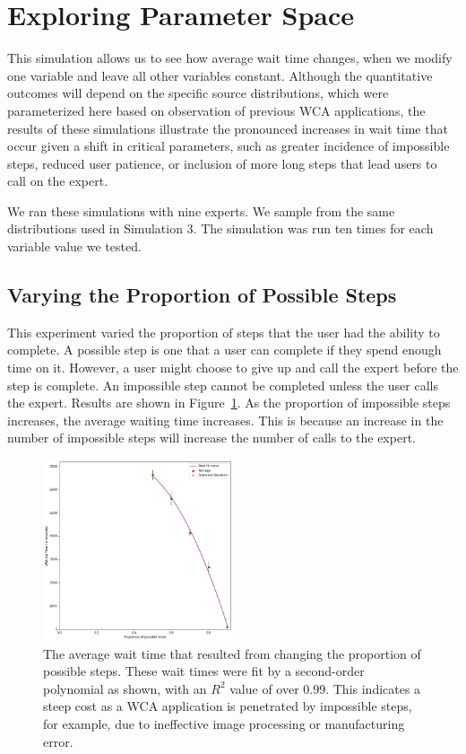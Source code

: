 \section{Exploring Parameter Space}

This simulation allows us to see how average wait time changes, when we modify
one variable and leave all other variables constant.
Although the quantitative outcomes will depend on the specific source
distributions, which were parameterized here based on observation of previous
WCA applications, the results of these simulations illustrate the pronounced
increases in wait time that occur given a shift in critical parameters, such as
greater incidence of impossible steps, reduced user patience, or inclusion of
more long steps that lead users to call on the expert.

We ran these simulations with nine experts.
We sample from the same distributions used in Simulation 3.
The simulation was run ten times for each variable value we tested.

\subsection{Varying the Proportion of Possible Steps}

This experiment varied the proportion of steps that the user had the ability to
complete.
A possible step is one that a user can complete if they spend enough time on it.
However, a user might choose to give up and call the expert before the step is
complete.
An impossible step cannot be completed unless the user calls the expert.
Results are shown in Figure~\ref{fig:vary_success}.
As the proportion of impossible steps increases, the average waiting time
increases.
This is because an increase in the number of impossible steps will increase the
number of calls to the expert.

\begin{figure}[h]
  \includegraphics[width=0.5\textwidth]{figures/montecarlo/vary_success.png}
  \caption{
    The average wait time that resulted from changing the proportion of possible
    steps.
    These wait times were fit by a second-order polynomial as shown, with an
    $R^2$ value of over 0.99.
    This indicates a steep cost as a WCA application is penetrated by impossible
    steps, for example, due to ineffective image processing or manufacturing
    error.
  }\label{fig:vary_success}
\end{figure}

